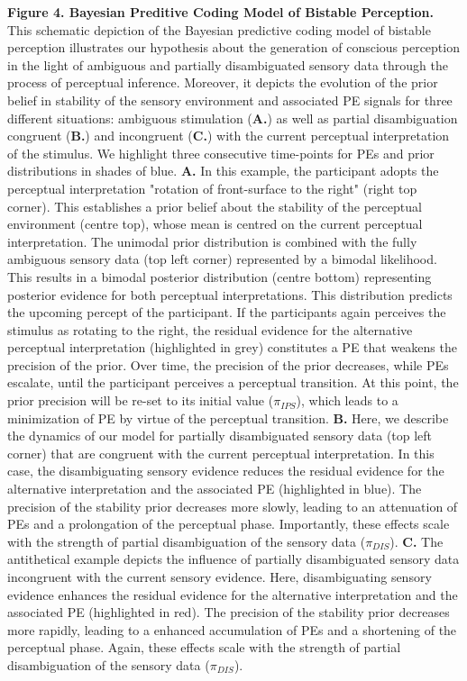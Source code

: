 \documentclass[12pt]{article}
\begin{document}
\textbf{Figure 4. Bayesian Preditive Coding Model of Bistable Perception.} This schematic depiction of the Bayesian predictive coding model of bistable perception \parencite{Weilnhammer2017} illustrates our hypothesis about the generation of conscious perception in the light of ambiguous and partially disambiguated sensory data through the process of perceptual inference. Moreover, it depicts the evolution of the prior belief in stability of the sensory environment and associated PE signals for three different situations: ambiguous stimulation (\textbf{A.}) as well as partial disambiguation congruent (\textbf{B.}) and incongruent (\textbf{C.}) with the current perceptual interpretation of the stimulus. We highlight three consecutive time-points for PEs and prior distributions in shades of blue. \textbf{A.} In this example, the participant adopts the perceptual interpretation "rotation of front-surface to the right" (right top corner). This establishes a prior belief about the stability of the perceptual environment (centre top), whose mean is centred on the current perceptual interpretation. The unimodal prior distribution is combined with the fully ambiguous sensory data (top left corner) represented by a bimodal likelihood. This results in a bimodal posterior distribution (centre bottom) representing posterior evidence for both perceptual interpretations. This distribution predicts the upcoming percept of the participant. If the participants again perceives the stimulus as rotating to the right, the residual evidence for the alternative perceptual interpretation (highlighted in grey) constitutes a PE that weakens the precision of the prior. Over time, the precision of the prior decreases, while PEs escalate, until the participant perceives a perceptual transition. At this point, the prior precision will be re-set to its initial value ($\pi_{IPS}$), which leads to a minimization of PE by virtue of the perceptual transition. \textbf{B.} Here, we describe the dynamics of our model for partially disambiguated sensory data (top left corner) that are congruent with the current perceptual interpretation. In this case, the disambiguating sensory evidence reduces the residual evidence for the alternative interpretation and the associated PE (highlighted in blue). The precision of the stability prior decreases more slowly, leading to an attenuation of PEs and a prolongation of the perceptual phase. Importantly, these effects scale with the strength of partial disambiguation of the sensory data ($\pi_{DIS}$). \textbf{C.} The antithetical example depicts the influence of partially disambiguated sensory data incongruent with the current sensory evidence. Here, disambiguating sensory evidence enhances the residual evidence for the alternative interpretation and the associated PE (highlighted in red). The precision of the stability prior decreases more rapidly, leading to a enhanced accumulation of PEs and a shortening of the perceptual phase. Again, these effects scale with the strength of partial disambiguation of the sensory data ($\pi_{DIS}$).

\clearpage
\nolinenumbers

\printbibliography


  
\end{document}
